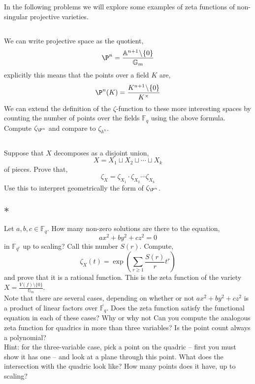 \documentclass[12pt]{article}
\newcommand{\sm}{\! \setminus \!}
\newcommand{\FF}{\mathbb{F}}
\theoremstyle{remark}
\theoremstyle{definition}
\newcommand{\A}{\mathbb{A}}
\newcommand{\Gm}{\mathbb{G}_m}
\begin{document}
In the following problems we will explore some examples of zeta functions of non-singular projective varieties. 

\subsection{}

We can write projective space as the quotient,
\[ \P^n = \frac{\A^{n+1} \sm \{ 0 \}}{\Gm} \]
explicitly this means that the points over a field $K$ are,
\[ \P^n(K) = \frac{K^{n+1} \sm \{ 0 \}}{K^\times } \]
We can extend the definition of the $\zeta$-function to these more interesting spaces by counting the number of points over the fields $\FF_q$ using the above formula. Compute $\zeta_{\P^n}$ and compare to $\zeta_{\A^n}$.

\subsection{}

Suppose that $X$ decomposes as a disjoint union,
\[ X = X_1 \sqcup X_2 \sqcup \cdots \sqcup X_k \]
of pieces. Prove that,
\[ \zeta_X = \zeta_{X_1} \cdot \zeta_{X_2} \cdots \zeta_{X_k} \]
Use this to interpret geometrically the form of $\zeta_{\P^n}$.

\subsection{$\ast$}

Let $a,b,c \in \FF_q$. How many non-zero solutions are there to the equation,
\[ a x^2 + b y^2 + c z^2 = 0 \]
in $\FF_{q^r}$ up to scaling? Call this number $S(r)$. Compute,
\[ \zeta_X(t) = \exp{ \left( \sum_{r \ge 1} \frac{S(r)}{r} t^r \right) } \] 
and prove that it is a rational function. This is the zeta function of the variety $X = \frac{V(f) \sm \{ 0 \}}{\Gm}$.
\\
Note that there are several cases, depending on whether or not $a x^2 + b y^2 + c z^2$ is a product of linear factors over $\overline{\FF_q}$. Does the zeta function satisfy the functional equation in each of these cases? Why or why not Can you compute the analogous zeta function for quadrics in more than three variables? Is the point count always a polynomial?
\\
Hint: for the three-variable case, pick a point on the quadric -- first you must show it has one -- and look at a plane through this point. What does the intersection with the quadric look like? How many points does it have, up to scaling?
\end{document}

